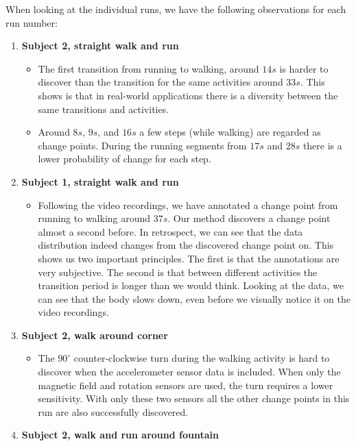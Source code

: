 When looking at the individual runs, we have the following observations for each run number:
\begin{enumerate}
  \item \textbf{Subject 2, straight walk and run} 
    \begin{itemize}
      \item The first transition from running to walking, around $14s$ is harder to discover than the transition for the same activities around $33s$.
      This shows is that in real-world applications there is a diversity between the same transitions and activities.
      \item Around $8s$, $9s$, and $16s$ a few steps (while walking) are regarded as change points.
      During the running segments from $17s$ and $28s$ there is a lower probability of change for each step.
    \end{itemize}
  \item \textbf{Subject 1, straight walk and run} 
    \begin{itemize}
      \item Following the video recordings, we have annotated a change point from running to walking around $37s$.
      Our method discovers a change point almost a second before.
      In retrospect, we can see that the data distribution indeed changes from the discovered change point on.
      This shows us two important principles.
      The first is that the annotations are very subjective.
      The second is that between different activities the transition period is longer than we would think.
      Looking at the data, we can see that the body slows down, even before we visually notice it on the video recordings.
    \end{itemize}
  \item \textbf{Subject 2, walk around corner} 
    \begin{itemize}
      \item The $90^{\circ}$ counter-clockwise turn during the walking activity is hard to discover when the accelerometer sensor data is included.
      When only the magnetic field and rotation sensors are used, the turn requires a lower sensitivity.
      With only these two sensors all the other change points in this run are also successfully discovered.
    \end{itemize}
  \item \textbf{Subject 2, walk and run around fountain} 

\end{enumerate}

